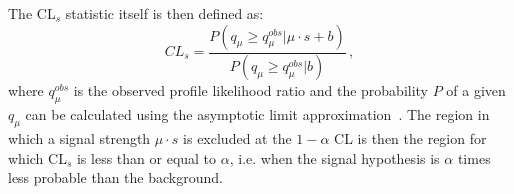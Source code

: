 The CL$_{s}$ statistic itself is then defined as:
\begin{equation}
  \label{eq:cls}
  CL_{s} = \frac{P(q_{\mu}\geqslant q_{\mu}^{obs} | \mu \cdot s + b)}{P(q_{\mu}\geqslant q_{\mu}^{obs}|b)}\,,
\end{equation}
where $q_{\mu}^{obs}$ is the observed profile likelihood ratio and the probability $P$ of a given $q_{\mu}$ can be calculated using the asymptotic limit approximation~\cite{Cowan:2010js}. The region in which a signal strength $\mu \cdot s$ is excluded at the $1 - \alpha$ \ac{CL} is then the region for which CL$_{s}$ is less than or equal to $\alpha$, i.e. when the signal hypothesis is $\alpha$ times less probable than the background.
